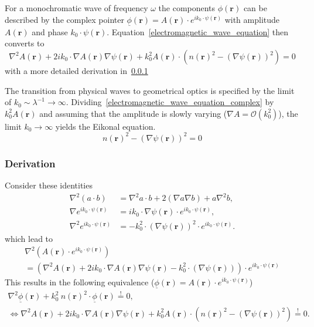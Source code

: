 For a monochromatic wave of frequency \(\omega \) the components \(\phi(\mathbf{r})\) can be described by the complex pointer \(\underline{\phi}(\mathbf{r}) = A(\mathbf{r}) \cdot e^{i k_0 \cdot \psi(\mathbf{r})}\) with amplitude \(A(\mathbf{r})\) and phase \(k_0 \cdot \psi(\mathbf{r})\).
Equation~\eqref{electromagnetic_wave_equation} then converts to 
\begin{equation}\label{electromagnetic_wave_equation_complex}
    \nabla^2 A(\mathbf{r}) + 2ik_0 \cdot \nabla A(\mathbf{r}) \nabla \psi(\mathbf{r}) + k_0^2 A(\mathbf{r}) \cdot ({n(\mathbf{r})}^2 - {(\nabla \psi(\mathbf{r}))}^2) = 0
\end{equation}
with a more detailed derivation in~\ref{derivation}

The transition from physical waves to geometrical optics is specified by the limit of \(k_0 \sim  \lambda^{-1} \rightarrow \infty \).
Dividing~\eqref{electromagnetic_wave_equation_complex} by \(k_0^2 A(\mathbf{r})\) and assuming that the amplitude is slowly varying (\(\nabla A = \mathcal{O}(k_0^2)\)), the limit \(k_0 \rightarrow \infty \) yields the Eikonal equation.
\begin{equation}
    {n(\mathbf{r})}^2 - {(\nabla \psi(\mathbf{r}))}^2 = 0
\end{equation}

\subsubsection{Derivation}\label{derivation}

Consider these identities
\begin{align}
    \nabla^2 (a \cdot b) &= \nabla^2 a \cdot b + 2 (\nabla a \nabla b) + a \nabla^2 b, \\
    \nabla e^{i k_0 \cdot \psi(\mathbf{r})} &= i k_0 \cdot \nabla \psi(\mathbf{r}) \cdot e^{i k_0 \cdot \psi(\mathbf{r})}, \\
    \nabla^2 e^{i k_0 \cdot \psi(\mathbf{r})} &= - k_0^2 \cdot {(\nabla \psi(\mathbf{r}))}^2 \cdot e^{i k_0 \cdot \psi(\mathbf{r})}.
\end{align}
which lead to
\begin{gather}
    \nabla^2 (A(\mathbf{r}) \cdot e^{ik_0 \cdot \psi(\mathbf{r})}) \\
    = (\nabla^2 A(\mathbf{r}) + 2ik_0 \cdot \nabla A(\mathbf{r}) \nabla \psi(\mathbf{r}) - k_0^2 \cdot (\nabla \psi(\mathbf{r}))) \cdot e^{ik_0 \cdot \psi(\mathbf{r})}
\end{gather}
This results in the following equivalence (\(\underline{\phi}(\mathbf{r}) = A(\mathbf{r}) \cdot e^{ik_0 \cdot \psi(\mathbf{r})}\))
\begin{gather}
    \nabla^2 \underline{\phi}(\mathbf{r}) + k_0^2\ n{(\mathbf{r})}^2 \cdot \underline{\phi}(\mathbf{r}) \stackrel{!}{=} 0, \\
    \Leftrightarrow \nabla^2 A(\mathbf{r}) + 2ik_0 \cdot \nabla A(\mathbf{r}) \nabla \psi(\mathbf{r}) + k_0^2 A(\mathbf{r}) \cdot ({n(\mathbf{r})}^2 - {(\nabla \psi(\mathbf{r}))}^2) \stackrel{!}{=} 0.
\end{gather}